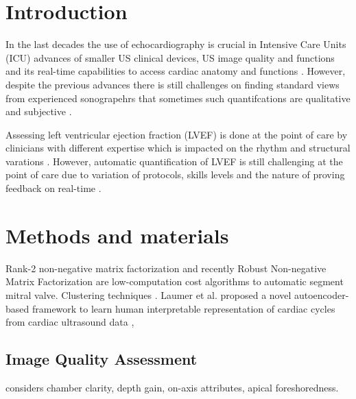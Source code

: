 \section{Introduction}
\label{sec:intro}
In the last decades the use of echocardiography is crucial in Intensive Care Units (ICU) advances of smaller US clinical devices, US image quality and functions and its real-time capabilities to access cardiac anatomy and functions \cite{Feigenbaum1996, Vieillard-Baron2008, singh2007, cambell2018}.
However, despite the previous advances there is still challenges on finding standard views from experienced sonograpehrs that sometimes  such quantifcations are qualitative and subjective \cite{Feigenbaum1996}.

Assessing left ventricular ejection fraction (LVEF) is done at the point of care by clinicians with different expertise which is impacted on the rhythm and structural varations \cite{liu2021}.
However, automatic quantification of LVEF is still challenging at the point of care due to variation of protocols, skills levels \cite{field2011} and the nature of proving feedback on real-time \cite{liu2021}.

\section{Methods and materials}
Rank-2 non-negative matrix factorization \cite{yuan2017} and recently Robust Non-negative Matrix Factorization
\cite{dukler2018} are low-computation cost algorithms to automatic segment mitral valve.
Clustering techniques \cite{zhang2018} \cite{kusunose2021}.
Laumer et al. proposed a novel autoencoder-based framework to learn human interpretable representation of cardiac cycles from cardiac ultrasound data \cite{laumer2020},

\subsection{Image Quality Assessment}
\cite{labs2021_in_miua} considers chamber clarity, depth gain, on-axis attributes, apical foreshoredness.
